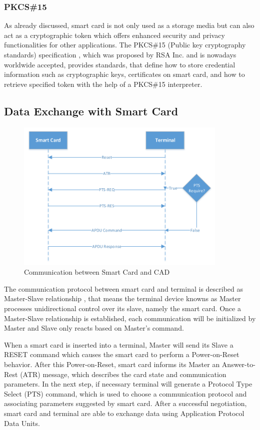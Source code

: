 \subsubsection{PKCS{\#}15}
As already discussed, smart card is not only used as a storage media but can also act as a cryptographic token which offers enhanced security and privacy functionalities for other applications. The PKCS\#15 (Public key cryptography standards) specification \cite{pkcs}, which was proposed by RSA Inc. and is nowadays worldwide accepted, provides standards, that define how to store credential information such as cryptographic keys, certificates on smart card, and how to retrieve specified token with the help of a PKCS\#15 interpreter.
 
\subsection{Data Exchange with Smart Card}

\begin{figure}[!htbp]
	\centering
	\includegraphics[width=0.9\textwidth]{master-slave-relationship}
		\caption{Communication between Smart Card and CAD \cite{handbuch}}
	\label{fig:master-slave-relationship}
\end{figure}
The communication protocol between smart card and terminal is described as Master-Slave relationship \cite{handbuch}, that means the terminal device knowns as Master processes unidirectional control over its slave, namely the smart card. Once a Master-Slave relationship is established, each communication will be initialized by Master and Slave only reacts based on Master's command. 

When a smart card is inserted into a terminal, Master will send its Slave a RESET command which causes the smart card to perform a Power-on-Reset behavior. After this Power-on-Reset, smart card informs its Master an Answer-to-Rest (ATR) message, which describes the card state and communication parameters. In the next step, if necessary terminal will generate a Protocol Type Select (PTS) command, which is used to choose a communication protocol and associating parameters suggested by smart card. After a successful negotiation, smart card and terminal are able to exchange data using Application Protocol Data Units.
  
